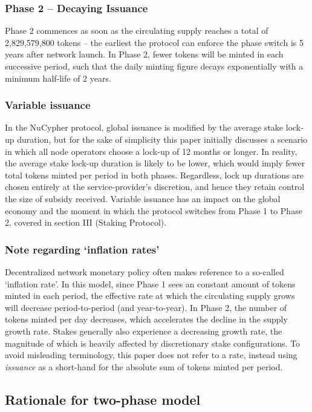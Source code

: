 \documentclass[longbibliography,nofootinbib]{revtex4-1}
\begin{document}
\subsubsection{Phase 2 – Decaying Issuance}
Phase 2 commences as soon as the circulating supply reaches a total of 2,829,579,800 tokens – the earliest the protocol can enforce the phase switch is 5 years after network launch. In Phase 2, fewer tokens will be minted in each successive period, such that the daily minting figure decays exponentially with a minimum half-life of 2 years. 

\subsubsection{Variable issuance}
In the NuCypher protocol, global issuance is modified by the average stake lock-up duration, but for the sake of simplicity this paper initially discusses a scenario in which all node operators choose a lock-up of 12 months or longer. In reality, the average stake lock-up duration is likely to be lower, which would imply fewer total tokens minted per period in both phases. Regardless, lock up durations are chosen entirely at the service-provider's discretion, and hence they retain control the size of subsidy received. Variable issuance has an impact on the global economy and the moment in which the protocol switches from Phase 1 to Phase 2, covered in section III (Staking Protocol). 

\subsubsection{Note regarding `inflation rates'}

Decentralized network monetary policy often makes reference to a so-called `inflation rate'. In this model, since Phase 1 sees an constant amount of tokens minted in each period, the effective rate at which the circulating supply grows will decrease period-to-period (and year-to-year). In Phase 2, the number of tokens minted per day decreases, which accelerates the decline in the supply growth rate. Stakes generally also experience a decreasing growth rate, the magnitude of which is heavily affected by discretionary stake configurations. To avoid misleading terminology, this paper does not refer to a rate, instead using \textit{issuance} as a short-hand for the absolute sum of tokens minted per period.

\subsection{Rationale for two-phase model}
\end{document}
